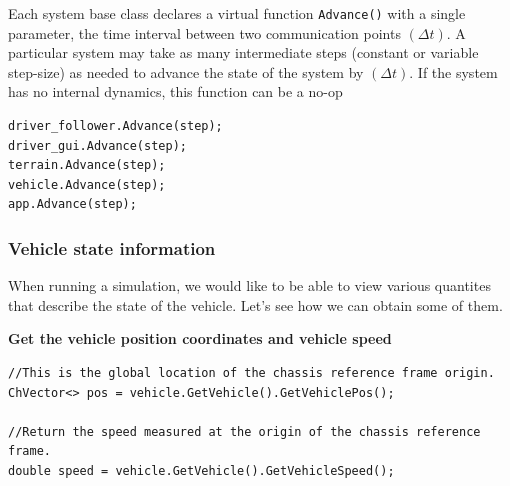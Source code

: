 Each system base class declares a virtual function \lstinline{Advance()}
with a single parameter, the time interval between two communication points $(\Delta t)$.
A particular system may take as many intermediate steps (constant or variable step-size) 
as needed to advance the state of the system by $(\Delta t)$.  If the system has no internal dynamics, this function can be a no-op

\begin{lstlisting}
driver_follower.Advance(step);
driver_gui.Advance(step);
terrain.Advance(step);
vehicle.Advance(step);
app.Advance(step);
\end{lstlisting}


\subsubsection{Vehicle state information}

When running a simulation, we would like to be able to view various quantites that describe the state of the vehicle. Let's see how
we can obtain some of them.

\textbf{Get the vehicle position coordinates and vehicle speed}

\begin{lstlisting}
//This is the global location of the chassis reference frame origin. 
ChVector<> pos = vehicle.GetVehicle().GetVehiclePos();

//Return the speed measured at the origin of the chassis reference frame.
double speed = vehicle.GetVehicle().GetVehicleSpeed();
\end{lstlisting}












